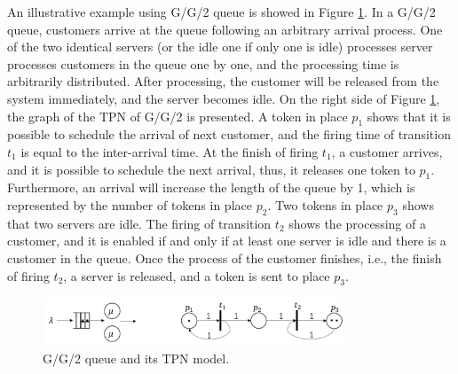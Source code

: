 \documentclass[suppldata]{interact}
\theoremstyle{plain}
\theoremstyle{definition}
\theoremstyle{remark}
\begin{document}
An illustrative example using G/G/2 queue is showed in Figure \ref{fig:gg1_petri}. In a G/G/2 queue, customers arrive at the queue following an arbitrary arrival process. One of the two identical servers (or the idle one if only one is idle) processes server processes customers in the queue one by one, and the processing time is arbitrarily distributed. After processing, the customer will be released from the system immediately, and the server becomes idle. On the right side of Figure \ref{fig:gg1_petri}, the graph of the TPN of G/G/2 is presented. A token in place $p_1$ shows that it is possible to schedule the arrival of next customer, and the firing time of transition $t_1$ is equal to the inter-arrival time. At the finish of firing $t_1$, a customer arrives, and it is possible to schedule the next arrival, thus, it releases one token to $p_1$. Furthermore, an arrival will increase the length of the queue by 1, which is represented by the number of tokens in place $p_2$. Two tokens in place $p_3$ shows that two servers are idle. The firing of transition $t_2$ shows the processing of a customer, and it is enabled if and only if at least one server is idle and there is a customer in the queue. Once the process of the customer finishes, i.e., the finish of firing $t_2$, a server is released, and a token is sent to place $p_3$.
\begin{figure}[h]
	\centering
	\includegraphics[width=0.8\textwidth]{Figures/GG1_petri.png}
	\caption{G/G/2 queue and its TPN model.}
	\label{fig:gg1_petri}
\end{figure}
\end{document}
